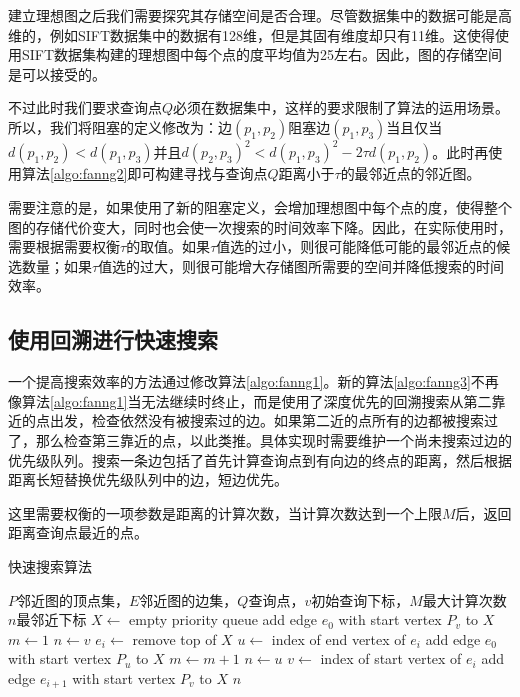 建立理想图之后我们需要探究其存储空间是否合理。尽管数据集中的数据可能是高维的，例如SIFT\cite{asuncion2007uci}数据集中的数据有128维，但是其固有维度却只有11维\cite{harwood2016fanng}。这使得使用SIFT数据集构建的理想图中每个点的度平均值为25左右。因此，图的存储空间是可以接受的。

不过此时我们要求查询点$Q$必须在数据集中，这样的要求限制了算法的运用场景。所以，我们将阻塞的定义修改为：边$(p_1,p_2)$阻塞边$(p_1,p_3)$当且仅当$d(p_1,p_2)<d(p_1,p_3)$并且$d(p_2,p_3)^2<d(p_1,p_3)^2-2\tau d(p_1,p_2)$。此时再使用算法\ref{algo:fanng2}即可构建寻找与查询点$Q$距离小于$\tau$的最邻近点的邻近图。

需要注意的是，如果使用了新的阻塞定义，会增加理想图中每个点的度，使得整个图的存储代价变大，同时也会使一次搜索的时间效率下降。因此，在实际使用时，需要根据需要权衡$\tau$的取值。如果$\tau$值选的过小，则很可能降低可能的最邻近点的候选数量；如果$\tau$值选的过大，则很可能增大存储图所需要的空间并降低搜索的时间效率。

\subsection{使用回溯进行快速搜索}

一个提高搜索效率的方法通过修改算法\ref{algo:fanng1}。新的算法\ref{algo:fanng3}\cite{harwood2016fanng}不再像算法\ref{algo:fanng1}当无法继续时终止，而是使用了深度优先的回溯搜索从第二靠近的点出发，检查依然没有被搜索过的边。如果第二近的点所有的边都被搜索过了，那么检查第三靠近的点，以此类推。具体实现时需要维护一个尚未搜索过边的优先级队列。搜索一条边包括了首先计算查询点到有向边的终点的距离，然后根据距离长短替换优先级队列中的边，短边优先。

这里需要权衡的一项参数是距离的计算次数，当计算次数达到一个上限$M$后，返回距离查询点最近的点。

\begin{algorithm}
	\caption{快速搜索算法}
	\label{algo:fanng3}
	\begin{algorithmic}[1] %
		\Require $P$邻近图的顶点集，$E$邻近图的边集，$Q$查询点，$v$初始查询下标，$M$最大计算次数 %
		\Ensure $n$最邻近下标 %
		\State $X\leftarrow$ empty priority queue
		\State add edge $e_0$ with start vertex $P_v$ to $X$
		\State $m\leftarrow 1$
		\State $n\leftarrow v$
		\State $e_i\leftarrow$ remove top of $X$
		\State $u\leftarrow$ index of end vertex of $e_i$
		\State add edge $e_0$ with start vertex $P_u$ to $X$
		\State $m\leftarrow m+1$
		\State $n\leftarrow u$
		\EndIf
		\EndIf
		\State $v\leftarrow$ index of start vertex of $e_i$
		\State add edge $e_{i+1}$ with start vertex $P_v$ to $X$
		\EndIf
		\EndWhile
		\Return $n$
	\end{algorithmic}
\end{algorithm}

